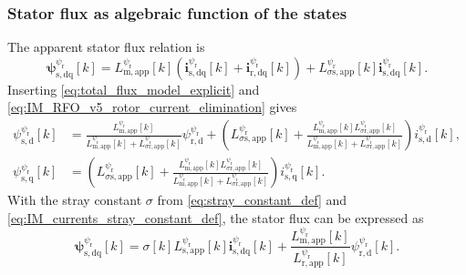 \begin{frame}
    \frametitle{Stator flux as algebraic function of the states}
    The apparent stator flux relation is
    \begin{equation*}
        \bm{\psi}^{\psi_\mathrm{r}}_{\mathrm{s},\mathrm{dq}}[k]
        =L^{\psi_\mathrm{r}}_{\mathrm{m},\mathrm{app}}[k]
        \left(\bm{i}^{\psi_\mathrm{r}}_{\mathrm{s},\mathrm{dq}}[k]+\bm{i}^{\psi_\mathrm{r}}_{\mathrm{r},\mathrm{dq}}[k]\right)
        +L^{\psi_\mathrm{r}}_{\sigma\mathrm{s},\mathrm{app}}[k]\bm{i}^{\psi_\mathrm{r}}_{\mathrm{s},\mathrm{dq}}[k].
        \label{eq:IM_RFO_v7_stator_app_relation}
    \end{equation*}\pause%
    Inserting \eqref{eq:total_flux_model_explicit} and \eqref{eq:IM_RFO_v5_rotor_current_elimination} gives
    \begin{equation}
        \begin{split}
            \psi^{\psi_\mathrm{r}}_{\mathrm{s},\mathrm{d}}[k]
             & =\frac{L^{\psi_\mathrm{r}}_{\mathrm{m},\mathrm{app}}[k]}
                {L^{\psi_\mathrm{r}}_{\mathrm{m},\mathrm{app}}[k]+L^{\psi_\mathrm{r}}_{\sigma\mathrm{r},\mathrm{app}}[k]}
            \psi^{\psi_\mathrm{r}}_{\mathrm{r},\mathrm{d}} +\left(L^{\psi_\mathrm{r}}_{\sigma\mathrm{s},\mathrm{app}}[k]
            +\frac{L^{\psi_\mathrm{r}}_{\mathrm{m},\mathrm{app}}[k]L^{\psi_\mathrm{r}}_{\sigma\mathrm{r},\mathrm{app}}[k]}
             {L^{\psi_\mathrm{r}}_{\mathrm{m},\mathrm{app}}[k]+L^{\psi_\mathrm{r}}_{\sigma\mathrm{r},\mathrm{app}}[k]}\right)i^{\psi_\mathrm{r}}_{\mathrm{s},\mathrm{d}}[k], \\[0.5ex]
            \psi^{\psi_\mathrm{r}}_{\mathrm{s},\mathrm{q}}[k]
             & =\left(L^{\psi_\mathrm{r}}_{\sigma\mathrm{s},\mathrm{app}}[k]
            +\frac{L^{\psi_\mathrm{r}}_{\mathrm{m},\mathrm{app}}[k]L^{\psi_\mathrm{r}}_{\sigma\mathrm{r},\mathrm{app}}[k]}
             {L^{\psi_\mathrm{r}}_{\mathrm{m},\mathrm{app}}[k]+L^{\psi_\mathrm{r}}_{\sigma\mathrm{r},\mathrm{app}}[k]}\right)i^{\psi_\mathrm{r}}_{\mathrm{s},\mathrm{q}}[k].
        \end{split}
        \label{eq:IM_RFO_v7_stator_flux_state_expr}
    \end{equation}
    With the stray constant $\sigma$ from \eqref{eq:stray_constant_def}  and \eqref{eq:IM_currents_stray_constant_def}, the stator flux can be expressed as
    \begin{equation}
        \bm{\psi}^{\psi_\mathrm{r}}_{\mathrm{s},\mathrm{dq}}[k] = \sigma[k] L^{\psi_\mathrm{r}}_{\mathrm{s},\mathrm{app}}[k]\bm{i}^{\psi_\mathrm{r}}_{\mathrm{s},\mathrm{dq}}[k] + \frac{L^{\psi_\mathrm{r}}_{\mathrm{m},\mathrm{app}}[k]}{L^{\psi_\mathrm{r}}_{\mathrm{r},\mathrm{app}}[k]}\psi^{\psi_\mathrm{r}}_{\mathrm{r},\mathrm{d}}[k].
        \label{eq:stator_flux_IM_stray_constant}
    \end{equation}
\end{frame}


